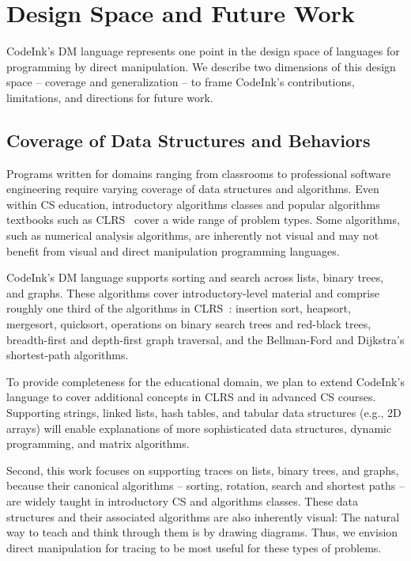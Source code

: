 \section{Design Space and Future Work}
\label{sec:design-and-future-work}

CodeInk's DM language represents one point in the design space of languages for
programming by direct manipulation. We describe two dimensions of this design
space -- coverage and generalization -- to frame CodeInk's contributions,
limitations, and directions for future work.

\subsection{Coverage of Data Structures and Behaviors}

Programs written for domains ranging from classrooms to professional
software engineering require varying coverage of data structures and
algorithms. Even within CS education, introductory
algorithms classes and popular algorithms textbooks such as
CLRS~\cite{Cormen2001} cover a wide range of problem types. Some algorithms,
such as numerical analysis algorithms, are inherently not visual and may
not benefit from visual and direct manipulation programming languages.

CodeInk's DM language supports sorting and search across lists, binary
trees, and graphs. These algorithms cover introductory-level material
and comprise roughly one third of the algorithms in
CLRS~\cite{Cormen2001}: insertion sort, heapsort, mergesort, quicksort,
operations on binary search trees and red-black trees, breadth-first and
depth-first graph traversal, and the Bellman-Ford and Dijkstra's
shortest-path algorithms.

To provide completeness for the educational domain, we plan to extend
CodeInk's language to cover additional concepts in CLRS and in advanced
CS courses. Supporting strings, linked lists, hash tables, and tabular
data structures (e.g., 2D arrays) will enable explanations of more
sophisticated data structures, dynamic programming, and matrix
algorithms.

Second, this work focuses on supporting traces on lists, binary trees, and
graphs, because their canonical algorithms -- sorting, rotation, search and
shortest paths -- are widely taught in introductory CS and algorithms classes.
These data structures and their associated algorithms are also inherently
visual: The natural way to teach and think through them is by drawing diagrams.
Thus, we envision direct manipulation for tracing to be most useful for these
types of problems.

